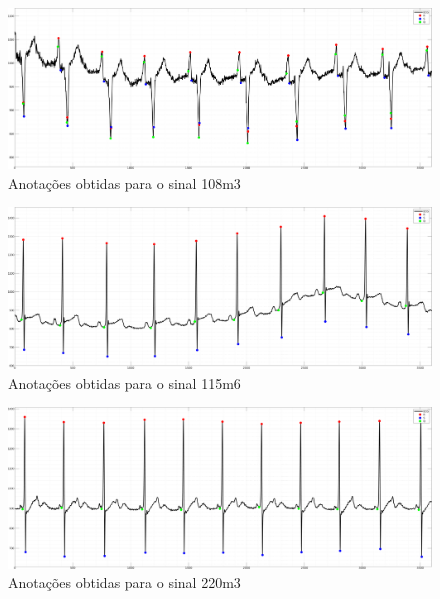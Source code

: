\documentclass{article}
\begin{document}
\begin{figure}[H]
	\begin{center}
		\includegraphics[scale=0.28]{../qrs_108m3.png}
		\caption{Anotações obtidas para o sinal 108m3}
		\label{fig:qrs_108m3}
	\end{center}
\end{figure}  

\begin{figure}[H]
	\begin{center}
		\includegraphics[scale=0.28]{../qrs_115m6.png}
		\caption{Anotações obtidas para o sinal 115m6}
		\label{fig:qrs_115m6}
	\end{center}
\end{figure}  

\begin{figure}[H]
	\begin{center}
		\includegraphics[scale=0.28]{../qrs_220m3.png}
		\caption{Anotações obtidas para o sinal 220m3}
		\label{fig:qrs_220m3}
	\end{center}
\end{figure}  
\end{document}
